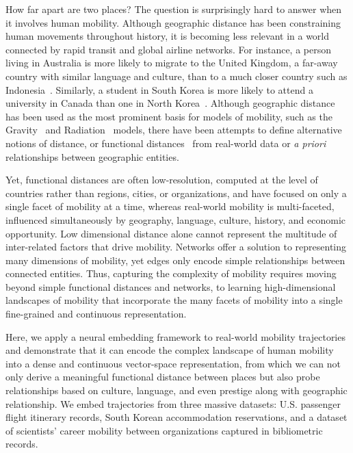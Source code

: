 \documentclass[12pt]{article} %
\begin{document}
How far apart are two places?
The question is surprisingly hard to answer when it involves human mobility.
Although geographic distance has been constraining human movements throughout history, it is becoming less relevant in a world connected by rapid transit and global airline networks.
For instance, a person living in Australia is more likely to migrate to the United Kingdom, a far-away country with similar language and culture, than to a much closer country such as Indonesia~\autocite{pew2018migration}.
Similarly, a student in South Korea is more likely to attend a university in Canada than one in North Korea~\autocite{unesco2019students}.
Although geographic distance has been used as the most prominent basis for models of mobility, such as the Gravity~\autocite{zipf1946gravity} and Radiation~\autocite{simini2012universal} models, there have been attempts to define alternative notions of distance, or functional distances~\autocite{boschma2005proximity, brown1970migration, kim2018functional} from real-world data or \textit{a priori} relationships between geographic entities.

Yet, functional distances are often low-resolution, computed at the level of countries rather than regions, cities, or organizations, and have focused on only a single facet of mobility at a time, whereas real-world mobility is multi-faceted, influenced simultaneously by geography, language, culture, history, and economic opportunity.  
Low dimensional distance alone cannot represent the multitude of inter-related factors that drive mobility. 
Networks offer a solution to representing many dimensions of mobility, yet edges only encode simple relationships between connected entities.
Thus, capturing the complexity of mobility requires moving beyond simple functional distances and networks, to learning high-dimensional landscapes of mobility that incorporate the many facets of mobility into a single fine-grained and continuous representation. 
			
Here, we apply a neural embedding framework to real-world mobility trajectories and demonstrate that it can encode the complex landscape of human mobility into a dense and continuous vector-space representation, from which we can not only derive a meaningful functional distance between places but also probe relationships based on culture, language, and even prestige along with geographic relationship. 
We embed trajectories from three massive datasets: U.S. passenger flight itinerary records, South Korean accommodation reservations, and a dataset of scientists' career mobility between organizations captured in bibliometric records. 
\end{document}
